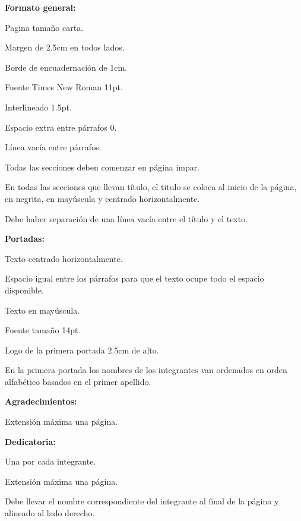 {{\begin{lista}
        \item \textbf{Formato general:}
        \begin{lista}
            \item Pagina tamaño carta.
            \item Margen de 2.5cm en todos lados.
            \item Borde de encuadernación de 1cm.
            \item Fuente Times New Roman 11pt.
            \item Interlineado 1.5pt.
            \item Espacio extra entre párrafos 0.
            \item Línea vacía entre párrafos.
            \item Todas las secciones deben comenzar en página impar.
            \item En todas las secciones que llevan título, el titulo se coloca al inicio de la página, en negrita, en mayúscula y centrado horizontalmente.
            \item Debe haber separación de una línea vacía entre el título y el texto.
        \end{lista}

        \item \textbf{Portadas:}
        \begin{lista}
            \item Texto centrado horizontalmente.
            \item Espacio igual entre los párrafos para que el texto ocupe todo el espacio disponible.
            \item Texto en mayúscula.
            \item Fuente tamaño 14pt.
            \item Logo de la primera portada 2.5cm de alto.
            \item En la primera portada los nombres de los integrantes van ordenados en orden alfabético basados en el primer apellido.
    \end{lista}

    \item \textbf{Agradecimientos:}
    \begin{lista}
        \item Extensión máxima una página.
    \end{lista}

    \item \textbf{Dedicatoria:}
    \begin{lista}
        \item Una por cada integrante.
        \item Extensión máxima una página.
        \item Debe llevar el nombre correspondiente del integrante al final de la página y alineado al lado derecho.
    \end{lista}


\end{lista}}}
